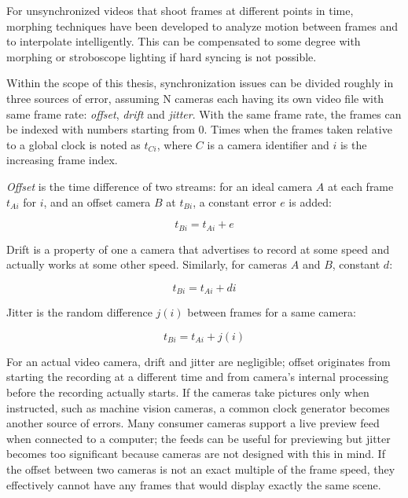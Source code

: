 For unsynchronized videos that shoot frames at different points in time, morphing techniques have been developed to analyze motion between frames and to interpolate intelligently.
This can be compensated to some degree with morphing or stroboscope lighting if hard syncing is not possible. \cite{bradley2009synchronization}

Within the scope of this thesis, synchronization issues can be divided roughly in three sources of error, assuming N cameras each having its own video file with same frame rate: \emph{offset}, \emph{drift} and \emph{jitter}.
With the same frame rate, the frames can be indexed with numbers starting from 0.
Times when the frames taken relative to a global clock is noted as $t_{Ci}$, where $C$ is a camera identifier and $i$ is the increasing frame index.

\emph{Offset} is the time difference of two streams: for an ideal camera $A$ at each frame $t_{Ai}$ for $i$, and an offset camera $B$ at $t_{Bi}$, a constant error $e$ is added:

\begin{equation} \label{eq:timeoffset}
	t_{Bi} = t_{Ai} + e
\end{equation}

Drift is a property of one a camera that advertises to record at some speed and actually works at some other speed. Similarly, for cameras $A$ and $B$, constant $d$:

\begin{equation} \label{eq:timedrift}
	t_{Bi} = t_{Ai} + d i
\end{equation}

Jitter is the random difference $j(i)$ between frames for a same camera:

\begin{equation} \label{eq:timejitter}
	t_{Bi} = t_{Ai} + j(i)
\end{equation}

For an actual video camera, drift and jitter are negligible; offset originates from starting the recording at a different time and from camera's internal processing before the recording actually starts.
If the cameras take pictures only when instructed, such as machine vision cameras, a common clock generator becomes another source of errors.
Many consumer cameras support a live preview feed when connected to a computer; the feeds can be useful for previewing but jitter becomes too significant because cameras are not designed with this in mind.
If the offset between two cameras is not an exact multiple of the frame speed, they effectively cannot have any frames that would display exactly the same scene.


